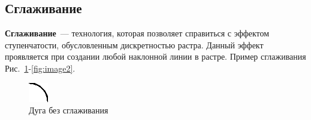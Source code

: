 
\subsection{Сглаживание}

\textbf{Сглаживание}~--- технология, которая позволяет справиться с эффектом ступенчатости, обусловленным дискретностью растра. Данный эффект проявляется при создании любой наклонной линии в растре. Пример сглаживания Рис.~\ref{fig:image1}-\ref{fig:image2}.

\begin{figure}[h!]
    \centering
    \begin{minipage}{0.3\textwidth}
        \includegraphics[width=\textwidth]{дуга.png} %
        \caption{Дуга без сглаживания}
        \label{fig:image1}
    \end{minipage} %
    \hspace{0.1\textwidth}
    \begin{minipage}{0.3\textwidth}

\end{minipage}
\end{figure}
